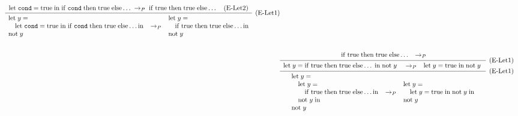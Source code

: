 \begin{align*}
{{{\begin{array}{l}
        \end{array}}
    } {
      \infer[\ERuleLetCtx] {
        \Reduce{P}
          {\begin{array}{l}
              \Let{\; y}
                {\\ \quad \Let{\; \code{cond} }{\true \;}{\; \If{\; \code{cond} \;}{\; \true \;}{\dots}}}
                {\\ \App{\mathrm{not}}{y \;}}
          \end{array}}
          {\begin{array}{l}
              \Let{\; y}
                {\\ \quad \If{\; \true \;}{\; \true \;}{\dots}}
                {\\ \App{\mathrm{not}}{y \;}}
          \end{array}}
      } {
        \Reduce{P}
          {\Let{\; \code{cond} }{\true \;}{\; \If{\; \code{cond} \;}{\; \true \;}{\dots}}}
          {\If{\; \true \;}{\; \true \;}{\dots}}
          \quad \ERuleLetSubst
      }
    }
  } \\\\
  & \infer[\ERuleLetCtx] {
    \Reduce{P}
      {\begin{array}{l}
        \Let{\; y}
          {\\ \quad \Let{\; y}
              {\\ \quad\quad \If{\; \true \;}{\; \true \;}{\dots}}
              {\\ \quad \App{\mathrm{not}}{y \;}}}
          {\\ \App{\mathrm{not}}{y}}
      \end{array}}
      {\begin{array}{l}
        \Let{\; y}
          {\\ \quad \Let{\; y}{\true \;}{\; \App{\mathrm{not}}{y \;}}}
          {\\ \App{\mathrm{not}}{y}}
      \end{array}}
  } {
    \infer[\ERuleLetCtx] {
      \Reduce{P}
        {\begin{array}{l}
          \Let{\; y}
              {\If{\; \true \;}{\; \true \;}{\dots} \;}
              {\; \App{\mathrm{not}}{y \;}}
        \end{array}}
        {\begin{array}{l}
          \Let{\; y}{\true \;}{\; \App{\mathrm{not}}{y \;}}
        \end{array}}
    } {
      \Reduce{P}
        {\begin{array}{l}
          \If{\; \true \;}{\; \true \;}{\dots}

\end{array}}}}
\end{align*}
